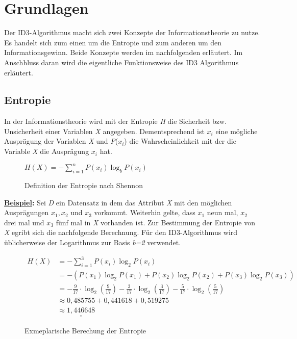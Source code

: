 \section{Grundlagen}
\label{id3:funktionsweise}

Der ID3-Algorithmus macht sich zwei Konzepte der Informationstheorie zu nutze. Es handelt sich zum einen um die Entropie und zum anderen um den Informationsgewinn. Beide Konzepte werden im nachfolgenden erläutert. Im Anschhluss daran wird die eigentliche Funktionsweise des ID3 Algorithmus erläutert.

\subsection{Entropie}
\label{id3:entropie}
In der Informationstheorie wird mit der Entropie \textit{H} die Sicherheit bzw. Unsicherheit  einer Variablen \textit{X} angegeben. Dementsprechend ist $x_{i}$ eine mögliche Ausprägung der Variablen \textit{X} und \textit{P}($x_{i}$) die Wahrscheinlichkeit mit der die Variable \textit{X} die Ausprägung $x_{i}$ hat. \autocite{EntropyClaudeShennon}

\begin{figure}[htbp]
    \vspace{0.5cm}
    \centering
    $ H(X) = - \sum\limits_{i=1}^{n} P(x_{i}) \log_{b} P(x_{i}) $
    \caption{Definition der Entropie nach Shennon\autocite{EntropyClaudeShennon}}
\end{figure}

\textbf{\underline{Beispiel}:} Sei \textit{D} ein Datensatz in dem  das Attribut \textit{X} mit den möglichen Ausprägungen $x_{1}, x_{2}$ und $x_{3}$ vorkommt. Weiterhin gelte, dass $x_{1}$ neun mal, $x_{2}$ drei mal und $x_{3}$ fünf mal in \textit{X} vorhanden ist. Zur Bestimmung der Entropie von \textit{X} egribt sich die nachfolgende Berechnung. Für den ID3-Algorithmus wird üblicherweise der Logarithmus zur Basis \textit{b=2} verwendet. \autocite{ImplementationID3}

\begin{figure}[htbp]
    \centering
    \begin{align*}
         H(X)   &= - \sum\limits_{i=1}^{3} P(x_{i}) \log_{2} P(x_{i})\\
                &= - (P(x_{1}) \log_{2} P(x_{1}) + P(x_{2}) \log_{2} P(x_{2}) + P(x_{3}) \log_{2} P(x_{3}))\\
                &= -\frac{9}{17} \cdot \log_{2} \left(\frac{9}{17}\right) - %
                    \frac{3}{17} \cdot \log_{2} \left(\frac{3}{17}\right) - %
                    \frac{5}{17} \cdot \log_{2} \left(\frac{5}{17}\right)\\
                &\approx 0,485755 + 0,441618 + 0,519275\\
                &\approx \underline{\underline{1,446648}}
    \end{align*}
    \caption{Exmeplarische Berechung der Entropie}
\end{figure}
\pagebreak

